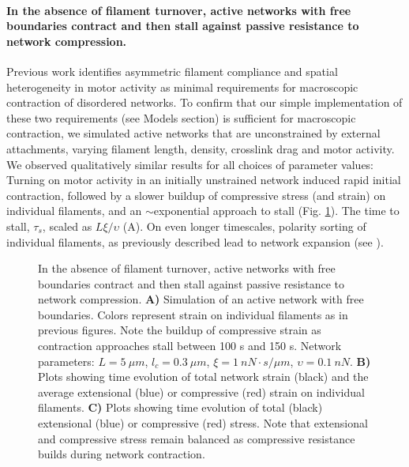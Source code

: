 \documentclass[10pt,letterpaper]{article}
\begin{document}
\paragraph{In the absence of filament turnover, active networks with free boundaries contract and then stall against passive resistance to network compression.}


Previous work \cite{1367-2630-14-3-033037,rheo_2D1,rheo_active} identifies asymmetric filament compliance and spatial heterogeneity in motor activity as minimal requirements for macroscopic contraction of disordered networks. To confirm that our simple implementation of these two requirements (see Models section) is sufficient for macroscopic contraction, we simulated active networks that are unconstrained by external attachments, varying filament length, density, crosslink drag and motor activity.  We observed qualitatively similar results for all choices of parameter values:  Turning on motor activity in an initially unstrained network induced rapid initial contraction, followed by a slower buildup of compressive stress (and strain) on individual filaments, and an $\sim$exponential approach to stall (Fig. \ref{fig:active_con}). The time to stall, $\tau_s$, scaled as $L\xi/\upsilon$ (A). On even longer timescales, polarity sorting of individual filaments, as previously described \cite{Reymann1310,Murrell15062014,Ndlec:1997aa,Surrey1167} lead to network expansion (see ).


\begin{figure}[h!]
	\centering
	\caption{\label{fig:active_con} In the absence of filament turnover, active networks with free boundaries contract and then stall against passive resistance to network compression. \textbf{A)}  Simulation of an active network with free boundaries. Colors represent strain on individual filaments as in previous figures.  Note the buildup of compressive strain as contraction approaches stall between 100 s and 150 s.  Network parameters: $L=5\: \mu m$, $l_c=0.3\: \mu m$, $\xi=1\: nN\cdot s/\mu m$, $\upsilon=0.1\: nN$.  \textbf{B)} Plots showing time evolution of total network strain (black) and the average extensional (blue) or compressive (red) strain on individual filaments.   \textbf{C)} Plots showing time evolution of total (black) extensional (blue) or compressive (red) stress.  Note that extensional and compressive stress remain balanced as compressive resistance builds during network contraction.}
\end{figure}
\end{document}
